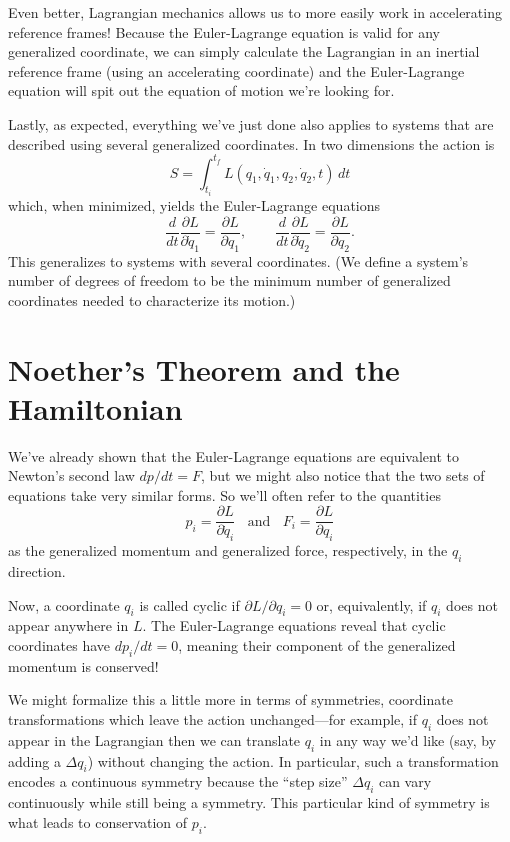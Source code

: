 \documentclass[../p111main.tex]{subfiles}
\begin{document}
Even better, Lagrangian mechanics allows us to more easily work in accelerating reference frames!
Because the Euler-Lagrange equation is valid for any generalized coordinate, we can simply calculate the Lagrangian in an inertial reference frame (using an accelerating coordinate) and the Euler-Lagrange equation will spit out the equation of motion we're looking for.

Lastly, as expected, everything we've just done also applies to systems that are described using several generalized coordinates.
In two dimensions the action is
\[ S = \int_{t_i}^{t_f} L(q_1, \dot q_1, q_2, \dot q_2, t) \,dt \]
which, when minimized, yields the Euler-Lagrange equations
\[ \frac{d}{dt} \frac{\partial L}{\partial \dot q_1} = \frac{\partial L}{\partial q_1}, \qquad \frac{d}{dt} \frac{\partial L}{\partial \dot q_2} = \frac{\partial L}{\partial q_2}. \]
This generalizes to systems with several coordinates.
(We define a system's number of degrees of freedom to be the minimum number of generalized coordinates needed to characterize its motion.)

\section{Noether's Theorem and the Hamiltonian}
We've already shown that the Euler-Lagrange equations are equivalent to Newton's second law $dp / dt = F$, but we might also notice that the two sets of equations take very similar forms.
So we'll often refer to the quantities
\[ p_{i} = \frac{\partial L}{\partial \dot q_i} \;\;\text{ and }\;\; F_i = \frac{\partial L}{\partial q_i} \]
as the generalized momentum and generalized force, respectively, in the $q_i$ direction.

Now, a coordinate $q_i$ is called cyclic if $\partial L / \partial q_i = 0$ or, equivalently, if $q_i$ does not appear anywhere in $L$.
The Euler-Lagrange equations reveal that cyclic coordinates have $dp_i / dt = 0$, meaning their component of the generalized momentum is conserved!

We might formalize this a little more in terms of symmetries, coordinate transformations which leave the action unchanged---for example, if $q_i$ does not appear in the Lagrangian then we can translate $q_i$ in any way we'd like (say, by adding a $\Delta q_i$) without changing the action.
In particular, such a transformation encodes a continuous symmetry because the ``step size'' $\Delta q_i$ can vary continuously while still being a symmetry.
This particular kind of symmetry is what leads to conservation of $p_i$.
\end{document}
